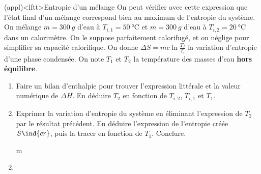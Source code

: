 \documentclass[../../main/main.tex]{subfiles}
\begin{document}
\begin{tcb*}[breakable](appl)<lftt>{Entropie d'un mélange}
	On peut vérifier avec cette expression que l'état final d'un mélange
	correspond bien au maximum de l'entropie du système.
	\smallbreak
	On mélange $m = \SI{300}{g}$ d'eau à $T_{i,1} = \SI{50}{\degreeCelsius}$ et
	$m = \SI{300}{g}$ d'eau à $T_{i,2} = \SI{20}{\degreeCelsius}$ dans un
	calorimètre. On le suppose parfaitement calorifugé, et on néglige pour
	simplifier sa capacité calorifique.
	\smallbreak
	On donne $\Delta{S} = mc \ln \frac{T_f}{T_i}$ la variation d'entropie d'une
	phase condensée. On note $T_1$ et $T_2$ la température des masses d'eau
	\textbf{hors équilibre}.
	\begin{enumerate}[label=\sqenumi]
		\item Faire un bilan d'enthalpie pour trouver l'expression littérale et
		      la valeur numérique de $\Delta{H}$. En déduire $T_2$ en fonction de
		      $T_{i,2}$, $T_{i,1}$ et $T_1$.
		\item Exprimer la variation d'entropie du système en éliminant
		      l'expression de $T_2$ par le résultat précédent. En déduire
		      l'expression de l'entropie créée $S\ind{cr}$, puis la tracer en
		      fonction de $T_1$. Conclure.
	\end{enumerate}
	\tcblower
	\begin{enumerate}[label=\sqenumi]
		\item[m]
		\item \vspace{-15pt}
		      \noindent
		      \begin{minipage}[t]{.60\linewidth}
\end{minipage}
\end{enumerate}
\end{tcb*}
\end{document}
